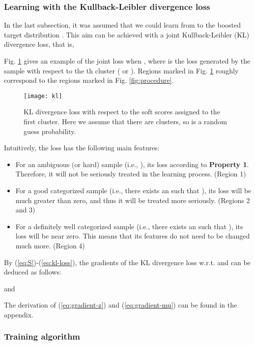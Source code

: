\documentclass[preprint,12pt]{elsarticle}
\begin{document}
\subsubsection{Learning with the Kullback-Leibler divergence loss}

In the last subsection, it was assumed that we could learn from  to the boosted target distribution .
This aim can be achieved with a joint Kullback-Leibler (KL) divergence loss, that is,

Fig. \ref{fig:kl} gives an example of the joint loss when , where 
is the loss generated by the sample  with respect to the th cluster ( or ). Regions marked
in Fig. \ref{fig:kl} roughly correspond to the regions marked in Fig. \ref{fig:procedure}.
\begin{figure}[!bht]
\centering
\texttt{[image: kl]}
\caption{KL divergence loss with respect to the soft scores assigned to the first cluster.
Here we assume that there are  clusters, so  is a random guess probability.
}\label{fig:kl}
\end{figure}

Intuitively, the loss has the following main features:
\begin{itemize}
\item For an ambiguous (or hard) sample (i.e., ), its loss
 according to \textbf{Property 1}.
Therefore, it will not be seriously treated in the learning process. (Region 1)
\item For a good categorized sample (i.e., there exists an  such that ),
its loss will be much greater than zero, and thus it will be treated more seriously. (Regions 2 and 3)
\item For a definitely well categorized sample (i.e., there exists an  such that
), its loss will be near zero. This means that its features do not
need to be changed much more. (Region 4)
\end{itemize}

By (\ref{eq:S})-(\ref{eq:kl-loss}), the gradients of the KL divergence loss w.r.t.  and  can be
deduced as follows:

and


The derivation of (\ref{eq:gradient-z}) and (\ref{eq:gradient-mu}) can be found in the appendix.



\subsubsection{Training algorithm}
\end{document}
